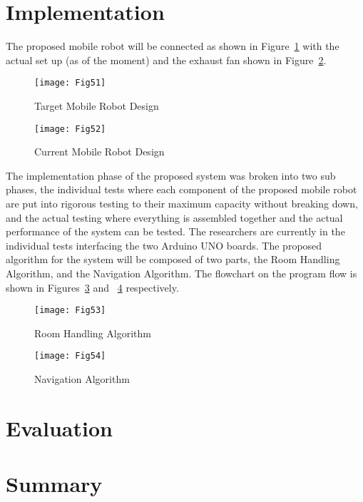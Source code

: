 \section{Implementation}

The proposed mobile robot will be connected as shown in Figure~\ref{fig:Fig51} with the actual set up (as of the moment) and the exhaust fan shown in Figure~\ref{fig:Fig52}.

\begin{figure}
	\centering
	\texttt{[image: Fig51]}
	\caption{Target Mobile Robot Design}
	\label{fig:Fig51}
\end{figure}

\begin{figure}
	\centering
	\texttt{[image: Fig52]}
	\caption{Current Mobile Robot Design}
	\label{fig:Fig52}
\end{figure}

The implementation phase of the proposed system was broken into two sub phases, the individual tests where each component of the proposed mobile robot are put into rigorous testing to their maximum capacity without breaking down, and the actual testing where everything is assembled together and the actual performance of the system can be tested. The researchers are currently in the individual tests interfacing the two Arduino UNO boards.
	The proposed algorithm for the system will be composed of two parts, the Room Handling Algorithm, and the Navigation Algorithm. The flowchart on the program flow is shown in Figures~\ref{fig:Fig53} and ~\ref{fig:Fig54} respectively.

\begin{figure}[!tb]
	\centering
	\texttt{[image: Fig53]}
	\caption{Room Handling Algorithm}
	\label{fig:Fig53}
\end{figure}

\begin{figure}
	\centering
	\texttt{[image: Fig54]}
	\caption{Navigation Algorithm}
	\label{fig:Fig54}
\end{figure}

\section{Evaluation}



\section{Summary}

